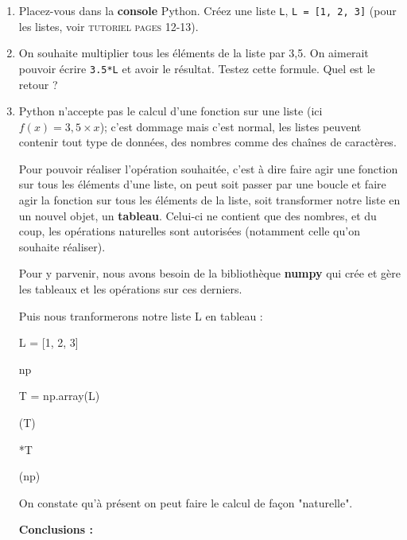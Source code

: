 \documentclass[11pt]{article}
\begin{document}
\begin{enumerate}
 \item Placez-vous dans la \textbf{console} Python. Créez une liste \texttt{L}, \texttt{L = [1, 2, 3]} (pour les listes, voir \textsc{tutoriel pages 12-13}).
 
 
 \item On souhaite multiplier tous les éléments de la liste par 3,5. On aimerait pouvoir écrire \texttt{3.5*L} et avoir le résultat. Testez cette formule. Quel est le retour ?
 
 \item Python n'accepte pas le calcul d'une fonction sur une liste (ici $f(x) = 3,5\times x$); c'est dommage mais c'est normal, les listes peuvent contenir tout type de données, des nombres comme des chaînes de caractères.
 
 \smallskip
 Pour pouvoir réaliser l'opération souhaitée, c'est à dire faire agir une fonction sur tous les éléments d'une liste, on peut soit passer par une boucle et faire agir la fonction sur tous les éléments de la liste, soit transformer notre liste en un nouvel objet, un \textbf{tableau}. Celui-ci ne contient que des nombres, et du coup, les opérations naturelles sont autorisées (notamment celle qu'on souhaite réaliser).
 
 \smallskip
  Pour y parvenir, nous avons besoin de la bibliothèque \textbf{numpy} qui crée et gère les tableaux et les opérations sur ces derniers.

   Puis nous tranformerons notre liste L en tableau : 
   
   
   \begin{python}{0.8}

   \chev L = [1, 2, 3]
   
    \chev  \as np 
    
    \chev T = np.array(L) 
    
    \chev \print(T)
    
    *T
    
    
    \chev \dir(np) 
    
   \end{python}

    On constate qu'à présent on peut faire le calcul de façon "naturelle".
    
    
    \textbf{Conclusions : } 
    

\end{enumerate}
\end{document}

